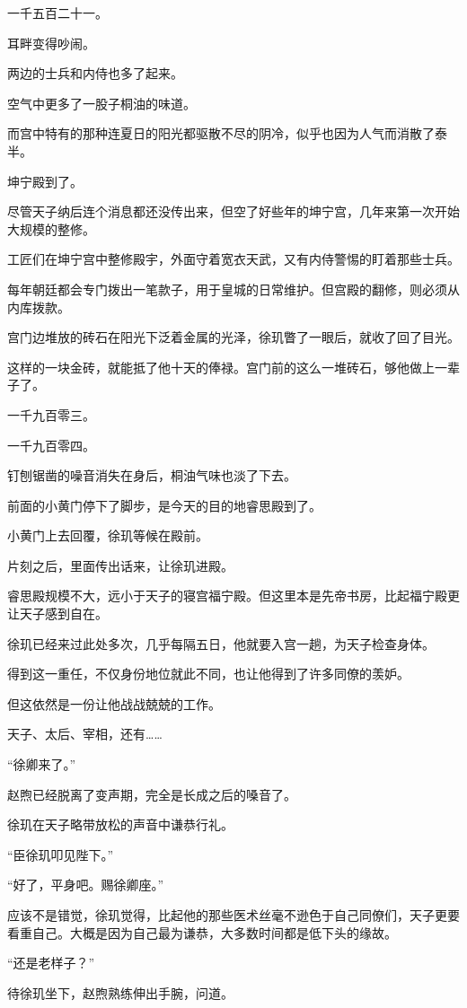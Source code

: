 一千五百二十一。

耳畔变得吵闹。

两边的士兵和内侍也多了起来。

空气中更多了一股子桐油的味道。

而宫中特有的那种连夏日的阳光都驱散不尽的阴冷，似乎也因为人气而消散了泰半。

坤宁殿到了。

尽管天子纳后连个消息都还没传出来，但空了好些年的坤宁宫，几年来第一次开始大规模的整修。

工匠们在坤宁宫中整修殿宇，外面守着宽衣天武，又有内侍警惕的盯着那些士兵。

每年朝廷都会专门拨出一笔款子，用于皇城的日常维护。但宫殿的翻修，则必须从内库拨款。

宫门边堆放的砖石在阳光下泛着金属的光泽，徐玑瞥了一眼后，就收了回了目光。

这样的一块金砖，就能抵了他十天的俸禄。宫门前的这么一堆砖石，够他做上一辈子了。

一千九百零三。

一千九百零四。

钉刨锯凿的噪音消失在身后，桐油气味也淡了下去。

前面的小黄门停下了脚步，是今天的目的地睿思殿到了。

小黄门上去回覆，徐玑等候在殿前。

片刻之后，里面传出话来，让徐玑进殿。

睿思殿规模不大，远小于天子的寝宫福宁殿。但这里本是先帝书房，比起福宁殿更让天子感到自在。

徐玑已经来过此处多次，几乎每隔五日，他就要入宫一趟，为天子检查身体。

得到这一重任，不仅身份地位就此不同，也让他得到了许多同僚的羡妒。

但这依然是一份让他战战兢兢的工作。

天子、太后、宰相，还有……

“徐卿来了。”

赵煦已经脱离了变声期，完全是长成之后的嗓音了。

徐玑在天子略带放松的声音中谦恭行礼。

“臣徐玑叩见陛下。”

“好了，平身吧。赐徐卿座。”

应该不是错觉，徐玑觉得，比起他的那些医术丝毫不逊色于自己同僚们，天子更要看重自己。大概是因为自己最为谦恭，大多数时间都是低下头的缘故。

“还是老样子？”

待徐玑坐下，赵煦熟练伸出手腕，问道。

